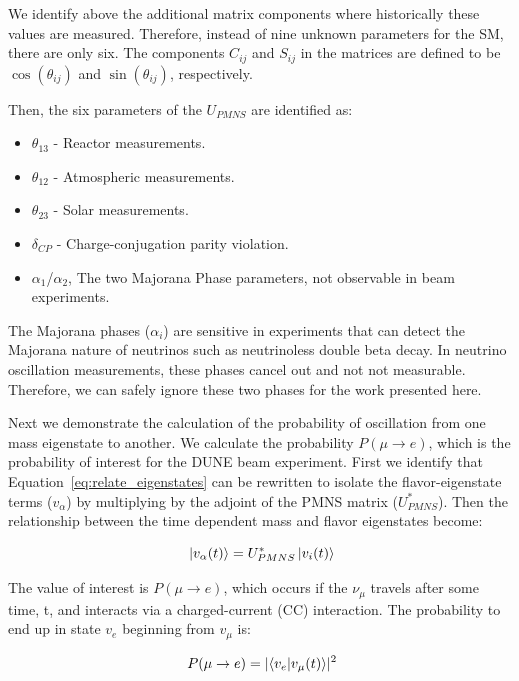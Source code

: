 We identify above the additional matrix components where historically these values are measured.
Therefore, instead of nine unknown parameters for the SM, there are only six.
The components $C_{ij}$ and $S_{ij}$ in the matrices are defined to be $\cos(\theta_{ij})$ and $\sin(\theta_{ij})$, respectively.

Then, the six parameters of the $U_{PMNS}$ are identified as:
\begin{itemize}
    \item $\theta_{13}$ - Reactor measurements.
    \item $\theta_{12}$ - Atmospheric measurements.
    \item $\theta_{23}$ - Solar measurements.
    \item $\delta_{CP}$ - Charge-conjugation parity violation.
    \item $\alpha_{1}$/$\alpha_{2}$, The two Majorana Phase parameters, not observable in beam experiments.
\end{itemize}

The Majorana phases ($\alpha_{i}$) are sensitive in experiments that can detect the Majorana nature of neutrinos such as neutrinoless double beta decay.
In neutrino oscillation measurements, these phases cancel out and not not measurable.
Therefore, we can safely ignore these two phases for the work presented here.

Next we demonstrate the calculation of the probability of oscillation from one mass eigenstate to another.
We calculate the probability $P(\mu \rightarrow e)$, which is the probability of interest for the DUNE beam experiment.
First we identify that Equation~\ref{eq:relate_eigenstates} can be rewritten to isolate the flavor-eigenstate terms ($v_{\alpha}$) by multiplying by the adjoint of the PMNS matrix ($U^{*}_{PMNS}$).
Then the relationship between the time dependent mass and flavor eigenstates become:

\begin{equation}~\label{eq:flavor_relation}
\ket{v_{\alpha}(t)} = U^{*}_{PMNS}\ket{v_{i}(t)}
\end{equation}

The value of interest is $P(\mu \rightarrow e)$, which occurs if the $\nu_{\mu}$ travels after some time, t, and interacts via a charged-current (CC) interaction.
The probability to end up in state $v_{e}$ beginning from $v_{\mu}$ is:

\begin{equation}~\label{eq:prob_calc1}
P(\mu \rightarrow e) = \lvert \braket{ v_{e} | v_{\mu} (t) }\rvert^{2}
\end{equation}

